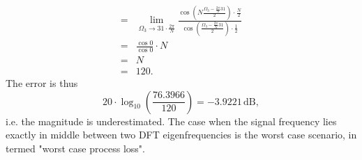 \documentclass[11pt,a4paper,DIV=12]{scrartcl}
\begin{document}
\begin{Loesung}
\begin{enumerate}[label=\alph*)]
\begin{align}
	=&\lim_{\Omega_3\to31\cdot\frac{2\pi}{N}}\frac{\cos\left(N\frac{\Omega_3-\frac{2\pi}{N}31}{2}\right)\cdot\frac{N}{2}}{\cos\left(\frac{\Omega_3-\frac{2\pi}{N}31}{2}\right)\cdot\frac{1}{2}}\nonumber\\
	=&\frac{\cos0}{\cos0}\cdot N\nonumber\\
	=&N\nonumber\\
	=&120\nonumber.
	\end{align}
%
	The error is thus
	\begin{equation}
	20\cdot\log_{10}\left(\frac{76.3966}{120}\right)=-3.9221\,\text{dB},\nonumber
	\end{equation}
	i.e. the magnitude is underestimated.
	The case when the signal frequency lies exactly in middle between two DFT
	eigenfrequencies is the worst case scenario, in \cite{Harris1978}
	termed "worst case process loss".
\end{enumerate}
\end{Loesung}


%

\end{document}
